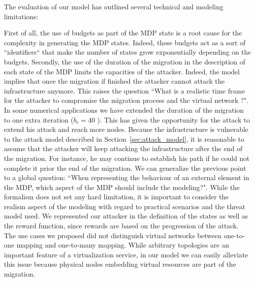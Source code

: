 \label{sec:mdp-discussion}
The evaluation of our model has outlined several technical and modeling limitations:

First of all, the use of budgets as part of the MDP state is a root cause for the complexity in generating the MDP states. Indeed, these budgets act as a sort of ``identifiers`` that make the number of states grow exponentially depending on the budgets.
Secondly, the use of the duration of the migration in the description of each state of the MDP limits the capacities of the attacker. Indeed, the model implies that once the migration if finished the attacker cannot attack the infrastructure anymore. This raises the question ``What is a realistic time frame for the attacker to compromise the migration process and the virtual network ?".
In some numerical applications we have extended the duration of the migration to one extra iteration ($b_c = 40$ ). This has given the opportunity for the attack to extend his attack and reach more nodes.
Because the infrastructure is vulnerable to the attack model described in Section~\ref{sec:attack_model}, it is reasonable to assume that the attacker will keep attacking the infrastructure after the end of the migration. For instance, he may continue to establish his path if he could not complete it prior the end of the migration.
We can generalize the previous point to a global question: ``When representing the behaviour of an external element in the MDP, which aspect of the MDP should include the modeling?". While the formalism does not set any hard limitation, it is important to consider the realism aspect of the modeling with regard to practical scenarios and the threat model used. We represented our attacker in the definition of the states as well as the reward function, since rewards are based on the progression of the attack.
The use cases we proposed did not distinguish virtual networks between one-to-one mapping and one-to-many mapping. While arbitrary topologies are an important feature of a virtualization service, in our model we can easily alleviate this issue because physical nodes embedding virtual resources are part of the migration.


